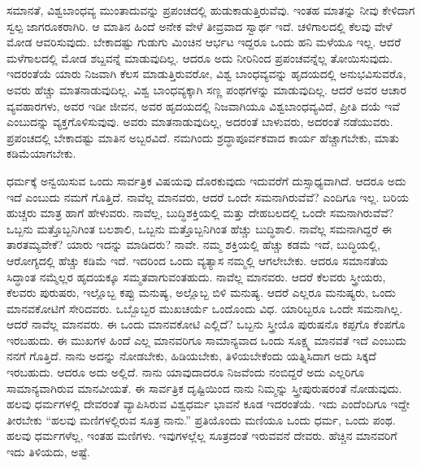 ಸಮಾನತೆ, ವಿಶ್ವಬಾಂಧವ್ಯ ಮುಂತಾದುವನ್ನು ಪ್ರಪಂಚದಲ್ಲಿ ಹುಡುಕಾಡುತ್ತಿರುವೆವು. ಇಂತಹ ಮಾತನ್ನು ನೀವು ಕೇಳಿದಾಗ ಸ್ವಲ್ಪ ಜಾಗರೂಕರಾಗಿರಿ. ಆ ಮಾತಿನ ಹಿಂದೆ ಅನೇಕ ವೇಳೆ ತೀವ್ರವಾದ ಸ್ವಾರ್ಥ ಇದೆ. ಚಳಿಗಾಲದಲ್ಲಿ ಕೆಲವು ವೇಳೆ ಮೋಡ ಆವರಿಸುವುದು. ಬೇಕಾದಷ್ಟು ಗುಡುಗು ಮಿಂಚಿನ ಆರ್ಭಟ ಇದ್ದರೂ ಒಂದು ಹನಿ ಮಳೆಯೂ ಇಲ್ಲ. ಆದರೆ ಮಳೆಗಾಲದಲ್ಲಿ ಮೋಡ ಶಬ್ದವನ್ನೆ ಮಾಡುವುದಿಲ್ಲ. ಆದರೂ ಅದು ನೀರಿನಿಂದ ಪ್ರಪಂಚವನ್ನೆಲ್ಲ ತೋಯಿಸುವುದು. ಇದರಂತೆಯೆ ಯಾರು ನಿಜವಾಗಿ ಕೆಲಸ ಮಾಡುತ್ತಿರುವರೋ, ವಿಶ್ವ ಬಾಂಧವ್ಯವನ್ನು ಹೃದಯದಲ್ಲಿ ಅನುಭವಿಸುವರೊ, ಅವರು ಹೆಚ್ಚು ಮಾತನಾಡುವುದಿಲ್ಲ. ವಿಶ್ವ ಬಾಂಧವ್ಯಕ್ಕಾಗಿ ಸಣ್ಣ ಪಂಥಗಳನ್ನು ಮಾಡುವುದಿಲ್ಲ. ಆದರೆ ಅವರ ಆಚಾರ ವ್ಯವಹಾರಗಳು, ಅವರ ಇಡೀ ಜೀವನ, ಅವರ ಹೃದಯದಲ್ಲಿ ನಿಜವಾಗಿಯೂ ವಿಶ್ವಬಾಂಧವ್ಯವಿದೆ, ಪ್ರೀತಿ ದಯೆ ಇವೆ ಎಂಬುದನ್ನು ವ್ಯಕ್ತಗೊಳಿಸುವುವು. ಅವರು ಮಾತನಾಡುವುದಿಲ್ಲ, ಅದರಂತೆ ಬಾಳುವರು, ಅದರಂತೆ ನಡೆಯುವರು. ಪ್ರಪಂಚದಲ್ಲಿ ಬೇಕಾದಷ್ಟು ಮಾತಿನ ಅಬ್ಬರವಿದೆ. ನಮಗಿಂದು ಶ್ರದ್ಧಾಪೂರ್ವಕವಾದ ಕಾರ್ಯ ಹೆಚ್ಚಾಗಬೇಕು, ಮಾತು ಕಡಿಮೆಯಾಗಬೇಕು.

ಧರ್ಮಕ್ಕೆ ಅನ್ವಯಿಸುವ ಒಂದು ಸಾರ್ವತ್ರಿಕ ವಿಷಯವು ದೊರಕುವುದು ಇದುವರೆಗೆ ದುಸ್ಸಾಧ್ಯವಾಗಿದೆ. ಆದರೂ ಅದು ಇದೆ ಎಂಬುದು ನಮಗೆ ಗೊತ್ತಿದೆ. ನಾವೆಲ್ಲ ಮಾನವರು, ಆದರೆ ಒಂದೇ ಸಮನಾಗಿರುವೆವೆ? ಎಂದಿಗೂ ಇಲ್ಲ. ಬರಿಯ ಹುಚ್ಚರು ಮಾತ್ರ ಹಾಗೆ ಹೇಳುವರು. ನಾವೆಲ್ಲ, ಬುದ್ಧಿಶಕ್ತಿಯಲ್ಲಿ ಮತ್ತು ದೇಹಬಲದಲ್ಲಿ ಒಂದೇ ಸಮನಾಗಿರುವೆವೆ? ಒಬ್ಬನು ಮತ್ತೊಬ್ಬನಿಗಿಂತ ಬಲಶಾಲಿ, ಒಬ್ಬನು ಮತ್ತೊಬ್ಬನಿಗಿಂತ ಹೆಚ್ಚು ಬುದ್ಧಿಶಾಲಿ. ನಾವೆಲ್ಲ ಸಮನಾಗಿದ್ದರೆ ಈ ತಾರತಮ್ಯವೇಕೆ? ಯಾರು ಇದನ್ನು ಮಾಡಿದರು? ನಾವೇ. ನಮ್ಮ ಶಕ್ತಿಯಲ್ಲಿ ಹೆಚ್ಚು ಕಡಮೆ ಇದೆ, ಬುದ್ಧಿಯಲ್ಲಿ, ಆರೋಗ್ಯದಲ್ಲಿ ಹೆಚ್ಚು ಕಡಿಮೆ ಇದೆ. ಇದರಿಂದ ಒಂದು ವ್ಯತ್ಯಾಸ ನಮ್ಮಲ್ಲಿ ಆಗಲೇಬೇಕು. ಆದರೂ ಸಮಾನತೆಯ ಸಿದ್ಧಾಂತ ನಮ್ಮೆಲ್ಲರ ಹೃದಯಕ್ಕೂ ಸಮ್ಮತವಾಗುವಂತಹುದು. ನಾವೆಲ್ಲ ಮಾನವರು. ಆದರೆ ಕೆಲವರು ಸ್ತ್ರೀಯರು, ಕೆಲವರು ಪುರುಷರು, ಇಲ್ಲೊಬ್ಬ ಕಪ್ಪು ಮನುಷ್ಯ, ಅಲ್ಲೊಬ್ಬ ಬಿಳಿ ಮನುಷ್ಯ. ಆದರೆ ಎಲ್ಲರೂ ಮನುಷ್ಯರು, ಒಂದು ಮಾನವಕೋಟಿಗೆ ಸೇರಿದವರು. ಒಬ್ಬೊಬ್ಬರ ಮುಖಚರ್ಯೆ ಒಂದೊಂದು ವಿಧ. ಯಾರಿಬ್ಬರೂ ಒಂದೇ ಸಮನಾಗಿಲ್ಲ. ಆದರೆ ನಾವೆಲ್ಲ ಮಾನವರು. ಈ ಒಂದು ಮಾನವಕೋಟಿ ಎಲ್ಲಿದೆ? ಒಬ್ಬನು ಸ್ತ್ರೀಯೊ ಪುರುಷನೊ ಕಪ್ಪಗೊ ಕೆಂಪಗೊ ಇರಬಹುದು. ಈ ಮುಖಗಳ ಹಿಂದೆ ಎಲ್ಲ ಮಾನವರಿಗೂ ಸಾಮಾನ್ಯವಾದ ಒಂದು ಸೂಕ್ಷ್ಮ ಮಾನವತೆ ಇದೆ ಎಂಬುದು ನನಗೆ ಗೊತ್ತಿದೆ. ನಾನು ಅದನ್ನು ನೋಡಬೇಕು, ಹಿಡಿಯಬೇಕು, ತಿಳಿಯಬೇಕೆಂದು ಯತ್ನಿಸಿದಾಗ ಅದು ಸಿಕ್ಕದೆ ಇರಬಹುದು. ಆದರೂ ಅದು ಅಲ್ಲಿದೆ. ನಾನು ಯಾವುದಾದರೂ ನಿಜವೆಂದು ನಂಬಿದ್ದರೆ ಅದು ಎಲ್ಲರಿಗೂ ಸಾಮಾನ್ಯವಾಗಿರುವ ಮಾನವೀಯತೆ. ಈ ಸಾರ್ವತ್ರಿಕ ದೃಷ್ಟಿಯಿಂದ ನಾನು ನಿಮ್ಮನ್ನು ಸ್ತ್ರೀಪುರುಷರಂತೆ ನೋಡುವುದು. ಹಲವು ಧರ್ಮಗಳಲ್ಲಿ ದೇವರಂತೆ ವ್ಯಾಪಿಸಿರುವ ವಿಶ್ವಧರ್ಮ ಭಾವನೆ ಕೂಡ ಇದರಂತೆಯೆ. ಇದು ಎಂದೆಂದಿಗೂ ಇದ್ದೇ ತೀರಬೇಕು “ಹಲವು ಮಣಿಗಳಲ್ಲಿರುವ ಸೂತ್ರ ನಾನು.” ಪ್ರತಿಯೊಂದು ಮಣಿಯೂ ಒಂದು ಧರ್ಮ, ಒಂದು ಪಂಥ. ಹಲವು ಧರ್ಮಗಳೆಲ್ಲ, ಇಂತಹ ಮಣಿಗಳು. ಇವುಗಳಲ್ಲೆಲ್ಲ ಸೂತ್ರದಂತೆ ಇರುವವನೆ ದೇವರು. ಹೆಚ್ಚಿನ ಮಾನವರಿಗೆ ಇದು ತಿಳಿಯದು, ಅಷ್ಟೆ.


